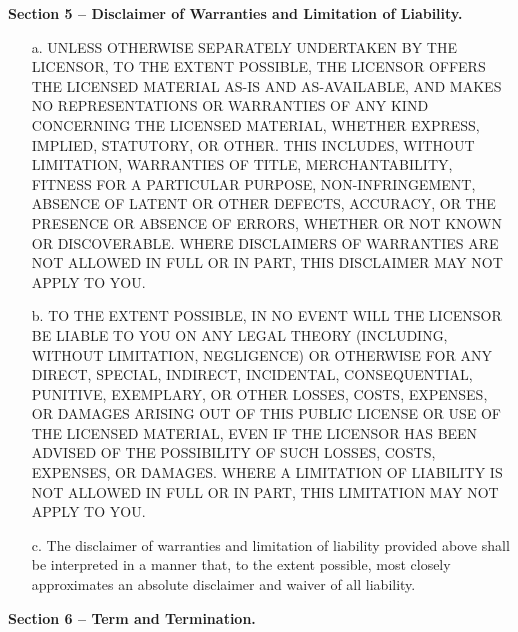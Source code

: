 \textbf{Section 5 -- Disclaimer of Warranties and Limitation of Liability.}

\begin{enumerate}

	\item[a.] UNLESS OTHERWISE SEPARATELY UNDERTAKEN BY THE LICENSOR, TO THE
	EXTENT POSSIBLE, THE LICENSOR OFFERS THE LICENSED MATERIAL AS-IS
	AND AS-AVAILABLE, AND MAKES NO REPRESENTATIONS OR WARRANTIES OF
	ANY KIND CONCERNING THE LICENSED MATERIAL, WHETHER EXPRESS,
	IMPLIED, STATUTORY, OR OTHER. THIS INCLUDES, WITHOUT LIMITATION,
	WARRANTIES OF TITLE, MERCHANTABILITY, FITNESS FOR A PARTICULAR
	PURPOSE, NON-INFRINGEMENT, ABSENCE OF LATENT OR OTHER DEFECTS,
	ACCURACY, OR THE PRESENCE OR ABSENCE OF ERRORS, WHETHER OR NOT
	KNOWN OR DISCOVERABLE. WHERE DISCLAIMERS OF WARRANTIES ARE NOT
	ALLOWED IN FULL OR IN PART, THIS DISCLAIMER MAY NOT APPLY TO YOU.

	\item[b.] TO THE EXTENT POSSIBLE, IN NO EVENT WILL THE LICENSOR BE LIABLE
	TO YOU ON ANY LEGAL THEORY (INCLUDING, WITHOUT LIMITATION,
	NEGLIGENCE) OR OTHERWISE FOR ANY DIRECT, SPECIAL, INDIRECT,
	INCIDENTAL, CONSEQUENTIAL, PUNITIVE, EXEMPLARY, OR OTHER LOSSES,
	COSTS, EXPENSES, OR DAMAGES ARISING OUT OF THIS PUBLIC LICENSE OR
	USE OF THE LICENSED MATERIAL, EVEN IF THE LICENSOR HAS BEEN
	ADVISED OF THE POSSIBILITY OF SUCH LOSSES, COSTS, EXPENSES, OR
	DAMAGES. WHERE A LIMITATION OF LIABILITY IS NOT ALLOWED IN FULL OR
	IN PART, THIS LIMITATION MAY NOT APPLY TO YOU.

	\item[c.] The disclaimer of warranties and limitation of liability provided
	above shall be interpreted in a manner that, to the extent
	possible, most closely approximates an absolute disclaimer and
	waiver of all liability.

\end{enumerate}


\textbf{Section 6 -- Term and Termination.}

